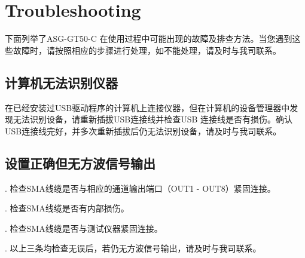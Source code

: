 \chapter{\heiti Troubleshooting}

下面列举了ASG-GT50-C 在使用过程中可能出现的故障及排查方法。当您遇到这些故障时，请按照相应的步骤进行处理，如不能处理，请及时与我司联系。

\section{\heiti 计算机无法识别仪器}
在已经安装过USB驱动程序的计算机上连接仪器，但在计算机的设备管理器中发现无法识别设备，请重新插拔USB连接线并检查USB 连接线是否有损伤。确认USB连接线完好，并多次重新插拔后仍无法识别设备，请及时与我司联系。

\section{\heiti 设置正确但无方波信号输出}
. 检查SMA线缆是否与相应的通道输出端口（OUT1 - OUT8）紧固连接。

. 检查SMA线缆是否有内部损伤。

. 检查SMA线缆是否与测试仪器紧固连接。

. 以上三条均检查无误后，若仍无方波信号输出，请及时与我司联系。

